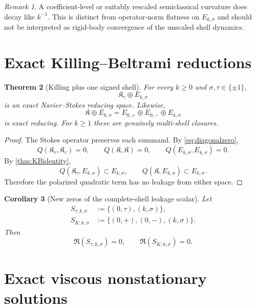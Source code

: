 \documentclass[
 aps,
 prd,
 reprint,
 amsmath,
 amssymb,
 nofootinbib,
 superscriptaddress
]{revtex4-2}
\newtheorem{theorem}{Theorem}[section]
\newtheorem{corollary}[theorem]{Corollary}
\theoremstyle{definition}
\theoremstyle{remark}
\newtheorem{remark}[theorem]{Remark}
\newcommand{\cK}{\mathfrak K}
\begin{document}
\begin{remark}
A coefficient-level or suitably rescaled semiclassical curvature does decay
like $k^{-1}$.  This is distinct from operator-norm flatness on
$E_{k,\sigma}$ and should not be interpreted as rigid-body convergence of the
unscaled shell dynamics.
\end{remark}



\section{Exact Killing--Beltrami reductions}

\begin{theorem}[Killing plus one signed shell]
\label{thm:KplusE}
For every $k\ge0$ and $\sigma,\tau\in\{\pm1\}$,
\begin{equation}
 \cK_\tau\oplus E_{k,\sigma}
 \label{eq:halfKclosure}
\end{equation}
is an exact Navier--Stokes reducing space.  Likewise,
\begin{equation}
 \boxed{
 \cK\oplus E_{k,\sigma}
 =
 E_{0,+}\oplus E_{0,-}\oplus E_{k,\sigma}
 }
 \label{eq:fullKclosure}
\end{equation}
is exact reducing.
For $k\ge1$ these are genuinely multi-shell closures.
\end{theorem}

\begin{proof}
The Stokes operator preserves each summand.  By
\eqref{eq:diagonalzero},
\[
 Q(\cK_\tau,\cK_\tau)=0,
 \qquad
 Q(\cK,\cK)=0,
 \qquad
 Q(E_{k,\sigma},E_{k,\sigma})=0.
\]
By \cref{thm:KBidentity},
\[
 Q(\cK_\tau,E_{k,\sigma})\subset E_{k,\sigma},
 \qquad
 Q(\cK,E_{k,\sigma})\subset E_{k,\sigma}.
\]
Therefore the polarized quadratic term has no leakage from either space.
\end{proof}

\begin{corollary}[New zeros of the complete-shell leakage scalar]
Let
\[
\begin{aligned}
 S_{\tau;k,\sigma}
 &:=
 \{(0,\tau),(k,\sigma)\},\\
 S_{K;k,\sigma}
 &:=
 \{(0,+),(0,-),(k,\sigma)\}.
\end{aligned}
\]
Then
\[
 \mathfrak R(S_{\tau;k,\sigma})=0,
 \qquad
 \boxed{\mathfrak R(S_{K;k,\sigma})=0.}
\]
\end{corollary}



\section{Exact viscous nonstationary solutions}
\end{document}
